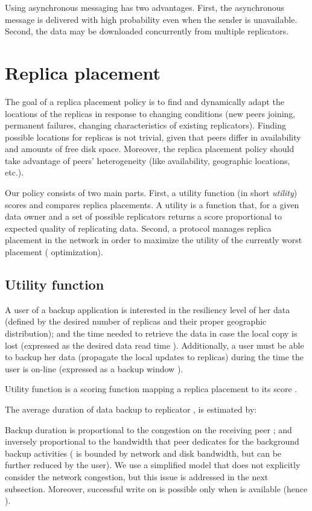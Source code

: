 \documentclass[10pt, final, conference, letterpaper]{IEEEtran}
\begin{document}
Using asynchronous messaging has two advantages. First, the asynchronous message is delivered with high probability even when the sender is unavailable. Second, the data may be downloaded concurrently from multiple replicators.

\section{Replica placement}\label{sec::replica-placement}
The goal of a replica placement policy is to find and dynamically adapt the locations of the replicas in response to changing conditions (new peers joining, permanent failures, changing characteristics of existing replicators).  
Finding possible locations for replicas is not trivial, given that peers differ in availability and amounts of free disk space.
Moreover, the replica placement policy should take advantage of peers' heterogeneity (like availability, geographic locations, etc.). 

Our policy consists of two main parts.
First, a utility function (in short \emph{utility}) scores and compares replica placements. A utility is a function that, for a given data owner and a set of possible replicators returns a score proportional to expected quality of replicating data.
Second, a protocol manages replica placement in the network in order to maximize the utility of the currently worst placement ( optimization).

\subsection{Utility function}\label{sec::utility-function}

A user of a backup application is interested in the resiliency level of her data (defined by the desired number of replicas  and their proper geographic distribution); 
and the time needed to retrieve the data in case the local copy is lost (expressed as the desired data read time ). Additionally, a user must be able to backup her data (propagate the local updates to replicas) during the time the user is on-line (expressed as a backup window ).

Utility function  is a scoring function mapping a replica placement  to its score .

The average duration of data backup to replicator ,  is estimated by:

Backup duration is proportional to the congestion on the receiving peer ; and inversely proportional to the bandwidth  that peer  dedicates for the background backup activities ( is bounded by network and disk bandwidth, but can be further reduced by the user). We use a simplified model that does not explicitly consider the network congestion, but this issue is addressed in the next subsection. Moreover, successful write on  is possible only when  is available (hence ).
\end{document}
